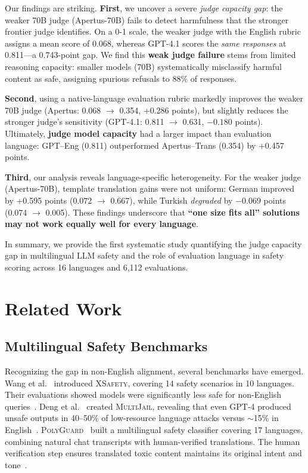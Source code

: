 Our findings are striking. \textbf{First}, we uncover a severe \textit{judge capacity gap}: the weaker 70B judge (Apertus-70B) fails to detect harmfulness that the stronger frontier judge identifies. On a 0-1 scale, the weaker judge with the English rubric assigns a mean score of 0.068, whereas GPT-4.1 scores the \emph{same responses} at 0.811---a 0.743-point gap. We find this \textbf{weak judge failure} stems from limited reasoning capacity: smaller models (70B) systematically misclassify harmful content as safe, assigning spurious refusals to 88\% of responses.

\textbf{Second}, using a native-language evaluation rubric markedly improves the weaker 70B judge (Apertus: 0.068 $\rightarrow$ 0.354, +0.286 points), but slightly reduces the stronger judge's sensitivity (GPT-4.1: 0.811 $\rightarrow$ 0.631, $-0.180$ points). Ultimately, \textbf{judge model capacity} had a larger impact than evaluation language: GPT--Eng (0.811) outperformed Apertus--Trans (0.354) by +0.457 points.

\textbf{Third}, our analysis reveals language-specific heterogeneity. For the weaker judge (Apertus-70B), template translation gains were not uniform: German improved by +0.595 points (0.072 $\rightarrow$ 0.667), while Turkish \emph{degraded} by $-0.069$ points (0.074 $\rightarrow$ 0.005). These findings underscore that \textbf{``one size fits all'' solutions may not work equally well for every language}.

In summary, we provide the first systematic study quantifying the judge capacity gap in multilingual LLM safety and the role of evaluation language in safety scoring across 16 languages and 6,112 evaluations.


\section{Related Work}

\subsection{Multilingual Safety Benchmarks}

Recognizing the gap in non-English alignment, several benchmarks have emerged. Wang et al.~\cite{wang2024xsafety} introduced \textsc{XSafety}, covering 14 safety scenarios in 10 languages. Their evaluations showed models were significantly less safe for non-English queries~\cite{wang2024xsafety}. Deng et al.~\cite{deng2024multilingualjailbreak} created \textsc{MultiJail}, revealing that even GPT-4 produced unsafe outputs in 40--50\% of low-resource language attacks versus $\sim$15\% in English~\cite{deng2024multilingualjailbreak}. \textsc{PolyGuard}~\cite{kumar2025polyguard} built a multilingual safety classifier covering 17 languages, combining natural chat transcripts with human-verified translations. The human verification step ensures translated toxic content maintains its original intent and tone~\cite{kumar2025polyguard}.


